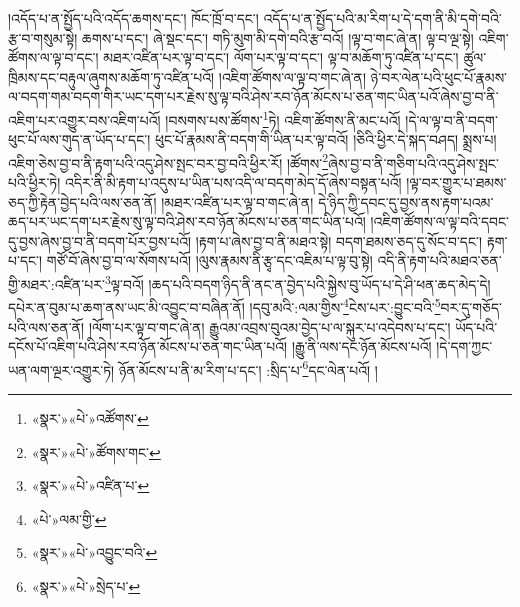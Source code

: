 །འདོད་པ་ན་སྤྱོད་པའི་འདོད་ཆགས་དང་། ཁོང་ཁྲོ་བ་དང་། འདོད་པ་ན་སྤྱོད་པའི་མ་རིག་པ་དེ་དག་ནི་མི་དགེ་བའི་རྩ་བ་གསུམ་སྟེ། ཆགས་པ་དང་། ཞེ་སྡང་དང་། གཏི་མུག་མི་དགེ་བའི་རྩ་བའོ། །ལྟ་བ་གང་ཞེ་ན། ལྟ་བ་ལྔ་སྟེ། འཇིག་ཚོགས་ལ་ལྟ་བ་དང་། མཐར་འཛིན་པར་ལྟ་བ་དང་། ལོག་པར་ལྟ་བ་དང་། ལྟ་བ་མཆོག་ཏུ་འཛིན་པ་དང་། ཚུལ་ཁྲིམས་དང་བརྟུལ་ཞུགས་མཆོག་ཏུ་འཛིན་པའོ། །འཇིག་ཚོགས་ལ་ལྟ་བ་གང་ཞེ་ན། ཉེ་བར་ལེན་པའི་ཕུང་པོ་རྣམས་ལ་བདག་གམ་བདག་གིར་ཡང་དག་པར་རྗེས་སུ་ལྟ་བའི་ཤེས་རབ་ཉོན་མོངས་པ་ཅན་གང་ཡིན་པའོ་ཞེས་བྱ་བ་ནི་འཇིག་པར་འགྱུར་བས་འཇིག་པའོ། །བསགས་པས་ཚོགས་\footnote{«སྣར་»«པེ་»འཚོགས་}ཏེ། འཇིག་ཚོགས་ནི་མང་པའོ། །དེ་ལ་ལྟ་བ་ནི་བདག་ཕུང་པོ་ལས་གུད་ན་ཡོད་པ་དང་། ཕུང་པོ་རྣམས་ནི་བདག་གི་ཡིན་པར་ལྟ་བའོ། །ཅིའི་ཕྱིར་དེ་སྐད་བཤད། སྨྲས་པ། འཇིག་ཅེས་བྱ་བ་ནི་རྟག་པའི་འདུ་ཤེས་སྤང་བར་བྱ་བའི་ཕྱིར་རོ། །ཚོགས་\footnote{«སྣར་»«པེ་»ཚོགས་གང་}ཞེས་བྱ་བ་ནི་གཅིག་པའི་འདུ་ཤེས་སྤང་པའི་ཕྱིར་ཏེ། འདིར་ནི་མི་རྟག་པ་འདུས་པ་ཡིན་པས་འདི་ལ་བདག་མེད་དོ་ཞེས་བསྟན་པའོ། །ལྟ་བར་གྱུར་པ་ཐམས་ཅད་ཀྱི་རྟེན་བྱེད་པའི་ལས་ཅན་ནོ། །མཐར་འཛིན་པར་ལྟ་བ་གང་ཞེ་ན། དེ་ཉིད་ཀྱི་དབང་དུ་བྱས་ནས་རྟག་པའམ་ཆད་པར་ཡང་དག་པར་རྗེས་སུ་ལྟ་བའི་ཤེས་རབ་ཉོན་མོངས་པ་ཅན་གང་ཡིན་པའོ། །འཇིག་ཚོགས་ལ་ལྟ་བའི་དབང་དུ་བྱས་ཞེས་བྱ་བ་ནི་བདག་པོར་བྱས་པའོ། །རྟག་པ་ཞེས་བྱ་བ་ནི་མཐའ་སྟེ། བདག་ཐམས་ཅད་དུ་སོང་བ་དང་། རྟག་པ་དང་། གཙོ་བོ་ཞེས་བྱ་བ་ལ་སོགས་པའོ། །ལུས་རྣམས་ནི་རྩྭ་དང་འཇིམ་པ་ལྟ་བུ་སྟེ། འདི་ནི་རྟག་པའི་མཐའ་ཅན་གྱི་མཐར་:འཛིན་པར་\footnote{«སྣར་»«པེ་»འཛིན་པ་}ལྟ་བའོ། །ཆད་པའི་བདག་ཉིད་ནི་ནང་ན་བྱེད་པའི་སྐྱེས་བུ་ཡོད་པ་དེ་ཤི་ཕན་ཆད་མེད་དེ། དཔེར་ན་བུམ་པ་ཆག་ནས་ཡང་མི་འབྱུང་བ་བཞིན་ནོ། །དབུ་མའི་:ལམ་གྱིས་\footnote{«པེ་»ལམ་གྱི་}ངེས་པར་:བྱུང་བའི་\footnote{«སྣར་»«པེ་»འབྱུང་བའི་}བར་དུ་གཅོད་པའི་ལས་ཅན་ནོ། །ལོག་པར་ལྟ་བ་གང་ཞེ་ན། རྒྱུའམ་འབྲས་བུའམ་བྱེད་པ་ལ་སྐུར་པ་འདེབས་པ་དང་། ཡོད་པའི་དངོས་པོ་འཇིག་པའི་ཤེས་རབ་ཉོན་མོངས་པ་ཅན་གང་ཡིན་པའོ། །རྒྱུ་ནི་ལས་དང་ཉོན་མོངས་པའོ། །དེ་དག་ཀྱང་ཡན་ལག་ལྔར་འགྱུར་ཏེ། ཉོན་མོངས་པ་ནི་མ་རིག་པ་དང་། :སྲིད་པ་\footnote{«སྣར་»«པེ་»སྲེད་པ་}དང་ལེན་པའོ། །

